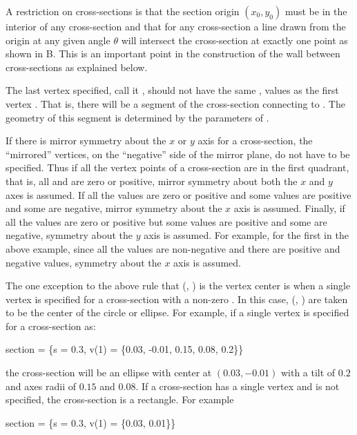 A restriction on cross-sections is that the section origin $(x_0,
y_0)$ must be in the interior of any cross-section and that for any
cross-section a line drawn from the origin at any given angle $\theta$
will intersect the cross-section at exactly one point as shown in
B. This is an important point in the construction
of the wall between cross-sections as explained below.

The last vertex specified, call it , should not have the
same ,  values as the first vertex . That
is, there will be a segment of the cross-section connecting
 to . The geometry of this segment is determined
by the parameters of .

If there is mirror symmetry about the $x$ or $y$ axis for a
cross-section, the ``mirrored'' vertices, on the ``negative'' side of
the mirror plane, do not have to be specified. Thus if all the vertex
points of a cross-section are in the first quadrant, that is, all
 and  are zero or positive, mirror symmetry about both
the $x$ and $y$ axes is assumed. If all the  values are zero
or positive and some  values are positive and some are
negative, mirror symmetry about the $x$ axis is assumed. Finally, if
all the  values are zero or positive but some  values
are positive and some are negative, symmetry about the $y$ axis is
assumed. For example, for the first in the above example, since all
the  values are non-negative and there are positive and
negative  values, symmetry about the $x$ axis is assumed.

The one exception to the above rule that (, ) is the
vertex center is when a single vertex  is specified for a
cross-section with a non-zero . In this case,
(, ) are taken to be the center of the circle or
ellipse. For example, if a single vertex is specified for a
cross-section as:
\begin{example}
  section = \{s = 0.3, v(1) = \{0.03, -0.01, 0.15, 0.08, 0.2\}\}
\end{example}
the cross-section will be an ellipse with center at $(0.03, -0.01)$
with a tilt of $0.2$ and axes radii of $0.15$ and $0.08$. If
a cross-section has a single vertex and  is not
specified, the cross-section is a rectangle. For example
\begin{example}
  section = \{s = 0.3, v(1) = \{0.03, 0.01\}\}
\end{example}

